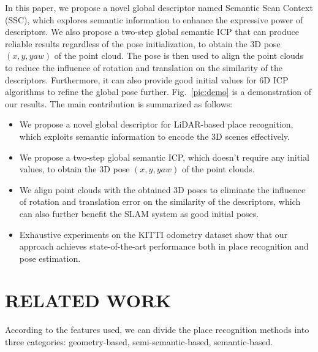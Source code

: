 \documentclass[letterpaper, 10 pt, conference]{ieeeconf}  %
\begin{document}
In this paper, we propose a novel global descriptor named Semantic Scan Context (SSC), which explores semantic information to enhance the expressive power of descriptors. We also propose a two-step global semantic ICP that can produce reliable results regardless of the pose initialization, to obtain the 3D pose $(x,y,yaw)$ of the point cloud. The pose is then used to align the point clouds to reduce the influence of rotation and translation on the similarity of the descriptors. Furthermore, it can also provide good initial values for 6D ICP algorithms to refine the global pose further. Fig.~\ref{pic:demo} is a demonstration of our results. The main contribution is summarized as follows:
\begin{itemize}
    \item We propose a novel global descriptor for LiDAR-based place recognition, which exploits semantic information to encode the 3D scenes effectively.
    \item We propose a two-step global semantic ICP, which doesn't require any initial values, to obtain the 3D pose $(x,y,yaw)$ of the point clouds.
    \item We align point clouds with the obtained 3D poses to eliminate the influence of rotation and translation error on the similarity of the descriptors, which can also further benefit the SLAM system as good initial poses.
    \item Exhaustive experiments on the KITTI odometry dataset show that our approach achieves state-of-the-art performance both in place recognition and pose estimation.
\end{itemize}



\section{RELATED WORK}

According to the features used, we can divide the place recognition methods into three categories: geometry-based, semi-semantic-based, semantic-based.
\end{document}
